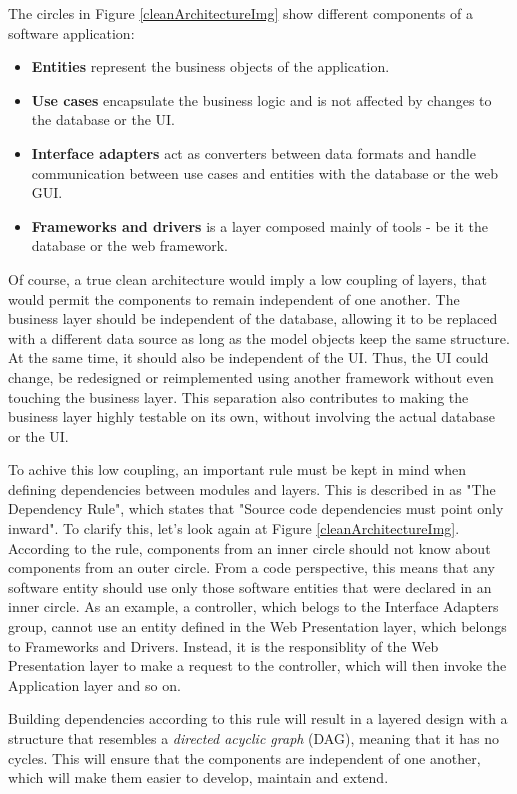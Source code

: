 The circles in Figure \ref{cleanArchitectureImg} show different components of a software application:

\begin{itemize}
    \item \textbf{Entities} represent the business objects of the application.
    \item \textbf{Use cases} encapsulate the business logic and is not affected by changes to the database or the UI.
    \item \textbf{Interface adapters} act as converters between data formats and handle communication between use cases and entities with the database or the web GUI.
    \item \textbf{Frameworks and drivers} is a layer composed mainly of tools - be it the database or the web framework.
\end{itemize}

Of course, a true clean architecture would imply a low coupling of layers, that would permit the components to remain independent of one another. The business layer should be independent of the database, allowing it to be replaced with a different data source as long as the model objects keep the same structure. At the same time, it should also be independent of the UI. Thus, the UI could change, be redesigned or reimplemented using another framework without even touching the business layer. This separation also contributes to making the business layer highly testable on its own, without involving the actual database or the UI.

To achive this low coupling, an important rule must be kept in mind when defining dependencies between modules and layers. This is described in \cite{cleanArchitecture} as "The Dependency Rule", which states that "Source code dependencies must point only inward". To clarify this, let's look again at Figure \ref{cleanArchitectureImg}. According to the rule, components from an inner circle should not know about components from an outer circle. From a code perspective, this means that any software entity should use only those software entities that were declared in an inner circle. As an example, a controller, which belogs to the Interface Adapters group, cannot use an entity defined in the Web Presentation layer, which belongs to Frameworks and Drivers. Instead, it is the responsiblity of the Web Presentation layer to make a request to the controller, which will then invoke the Application layer and so on.

Building dependencies according to this rule will result in a layered design with a structure that resembles a \textit{directed acyclic graph} (DAG), meaning that it has no cycles. This will ensure that the components are independent of one another, which will make them easier to develop, maintain and extend.


